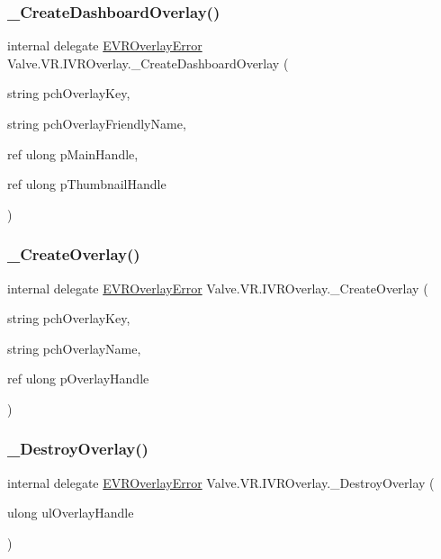 \subsubsection{\texorpdfstring{\_CreateDashboardOverlay()}{\_CreateDashboardOverlay()}}
{\footnotesize\ttfamily internal delegate \mbox{\hyperlink{namespace_valve_1_1_v_r_aaee5c5144f42b7969d45b854f51b0c18}{E\+V\+R\+Overlay\+Error}} Valve.\+V\+R.\+I\+V\+R\+Overlay.\+\_\+\+Create\+Dashboard\+Overlay (\begin{DoxyParamCaption}\item[{string}]{pch\+Overlay\+Key,  }\item[{string}]{pch\+Overlay\+Friendly\+Name,  }\item[{ref ulong}]{p\+Main\+Handle,  }\item[{ref ulong}]{p\+Thumbnail\+Handle }\end{DoxyParamCaption})}

\mbox{\label{struct_valve_1_1_v_r_1_1_i_v_r_overlay_a668f4b8031576ec88d6b713b995592af}} 
\subsubsection{\texorpdfstring{\_CreateOverlay()}{\_CreateOverlay()}}
{\footnotesize\ttfamily internal delegate \mbox{\hyperlink{namespace_valve_1_1_v_r_aaee5c5144f42b7969d45b854f51b0c18}{E\+V\+R\+Overlay\+Error}} Valve.\+V\+R.\+I\+V\+R\+Overlay.\+\_\+\+Create\+Overlay (\begin{DoxyParamCaption}\item[{string}]{pch\+Overlay\+Key,  }\item[{string}]{pch\+Overlay\+Name,  }\item[{ref ulong}]{p\+Overlay\+Handle }\end{DoxyParamCaption})}

\mbox{\label{struct_valve_1_1_v_r_1_1_i_v_r_overlay_a7d6cd1a264d3c052ca478ea34a3606ce}} 
\subsubsection{\texorpdfstring{\_DestroyOverlay()}{\_DestroyOverlay()}}
{\footnotesize\ttfamily internal delegate \mbox{\hyperlink{namespace_valve_1_1_v_r_aaee5c5144f42b7969d45b854f51b0c18}{E\+V\+R\+Overlay\+Error}} Valve.\+V\+R.\+I\+V\+R\+Overlay.\+\_\+\+Destroy\+Overlay (\begin{DoxyParamCaption}\item[{ulong}]{ul\+Overlay\+Handle }\end{DoxyParamCaption})}

